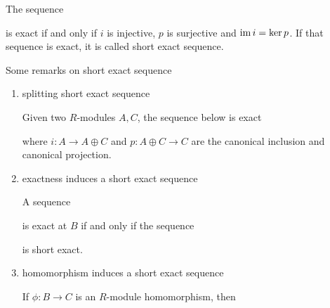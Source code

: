 \begin{definition}
	The sequence
	\begin{center}
	\end{center}
	
	is exact if and only if $i$ is injective, $p$ is surjective and $\operatorname{im} i = \ker p$. If that sequence is exact, it is called short exact sequence.
\end{definition}

\begin{remark}
	Some remarks on short exact sequence
	\begin{enumerate}
		\item splitting short exact sequence
		
		Given two $R$-modules $A, C$, the sequence below is exact
			\begin{center}
		\end{center}
		
		where $i: A \to A \oplus C$ and $p: A \oplus C \to C$ are the canonical inclusion and canonical projection.
		
		\item  exactness induces a short exact sequence
		
		A sequence  is exact at $B$ if and only if the sequence 
		\begin{center}
		\end{center}
		
		is short exact.
		
		\item homomorphism induces a short exact sequence
		
		If $\phi: B \to C$ is an $R$-module homomorphism, then
		\begin{center}
		\end{center}
		

\end{enumerate}
\end{remark}
